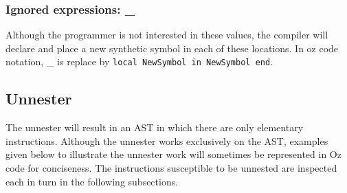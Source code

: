 \documentclass[a4paper]{memoir}
\begin{document}
\subsubsection{Ignored expressions: \_}
Although the programmer is not interested in these values, the compiler will declare and place a new synthetic symbol in each of these locations. In oz code notation, \_ is replace by \lstinline!local NewSymbol in NewSymbol end!.
\subsection{Unnester}            
The unnester will result in an AST in which there are only elementary instructions. Although the unnester works exclusively on the AST, examples given below to illustrate the unnester work will sometimes be represented in Oz code for conciseness.  The instructions susceptible to be unnested are inspected each in turn in the following subsections.
\end{document}
